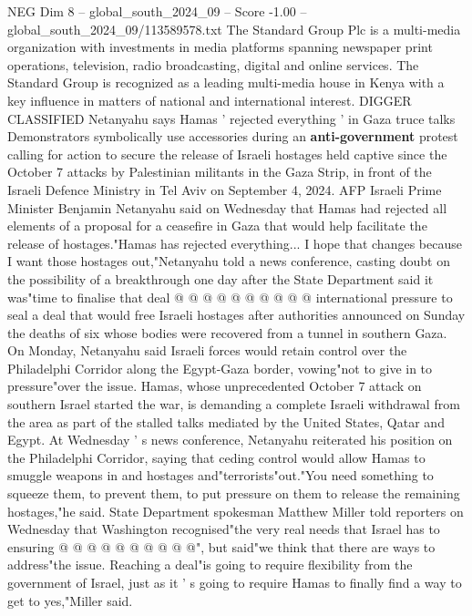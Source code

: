 \begin{textsample}{NEG Dim 8 – global\_south\_2024\_09 – Score -1.00 – global\_south\_2024\_09/113589578.txt}  \label{ex:f8_neg_166}
The Standard Group Plc is a multi-media organization with investments in media platforms spanning newspaper print operations, television, radio broadcasting, digital and online services.
The Standard Group is recognized as a leading multi-media house in Kenya with a key influence in matters of national and international interest.
DIGGER CLASSIFIED Netanyahu says Hamas ' rejected everything ' in Gaza truce talks Demonstrators symbolically use accessories during an \textbf{anti-government} protest calling for action to secure the release of Israeli hostages held captive since the October 7 attacks by Palestinian militants in the Gaza Strip, in front of the Israeli Defence Ministry in Tel Aviv on September 4, 2024.
AFP Israeli Prime Minister Benjamin Netanyahu said on Wednesday that Hamas had rejected all elements of a proposal for a ceasefire in Gaza that would help facilitate the release of hostages."Hamas has rejected everything...
I hope that changes because I want those hostages out,"Netanyahu told a news conference, casting doubt on the possibility of a breakthrough one day after the State Department said it was"time to finalise that deal @ @ @ @ @ @ @ @ @ @ international pressure to seal a deal that would free Israeli hostages after authorities announced on Sunday the deaths of six whose bodies were recovered from a tunnel in southern Gaza.
On Monday, Netanyahu said Israeli forces would retain control over the Philadelphi Corridor along the Egypt-Gaza border, vowing"not to give in to pressure"over the issue.
Hamas, whose unprecedented October 7 attack on southern Israel started the war, is demanding a complete Israeli withdrawal from the area as part of the stalled talks mediated by the United States, Qatar and Egypt.
At Wednesday ' s news conference, Netanyahu reiterated his position on the Philadelphi Corridor, saying that ceding control would allow Hamas to smuggle weapons in and hostages and"terrorists"out."You need something to squeeze them, to prevent them, to put pressure on them to release the remaining hostages,"he said.
State Department spokesman Matthew Miller told reporters on Wednesday that Washington recognised"the very real needs that Israel has to ensuring @ @ @ @ @ @ @ @ @ @", but said"we think that there are ways to address"the issue.
Reaching a deal"is going to require flexibility from the government of Israel, just as it ' s going to require Hamas to finally find a way to get to yes,"Miller said.

\end{textsample}
